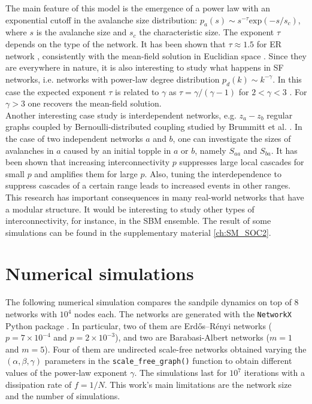  The main feature of this model is the emergence of a power law with an exponential cutoff in the avalanche size distribution: $p_a(s) \sim s^{-\tau}\text{exp}(-s/s_c)$, where $s$ is the avalanche size and $s_c$ the characteristic size. The exponent $\tau$ depends on the type of the network. It has been shown that $\tau \approx 1.5$ for ER network \cite{bonabeau1995sandpile}, consistently with the mean-field solution in Euclidian space \cite{alstrom1988mean}. Since they are everywhere in nature, it is also interesting to study what happens in SF networks, i.e. networks with power-law degree distribution $p_d(k)\sim k^{-\gamma}$. In this case the expected exponent $\tau$ is related to $\gamma$ as $\tau = \gamma/(\gamma - 1)$ for $2<\gamma<3$ \cite{goh2003sandpile}. For $\gamma > 3$ one recovers the mean-field solution.  \\
 Another interesting case study is interdependent networks, e.g. $z_a-z_b$ regular graphs coupled by Bernoulli-distributed coupling studied by Brummitt et al. \cite{brummitt2012suppressing}. In the case of two independent networks $a$ and $b$, one can investigate the sizes of avalanches in $a$ caused by an initial topple in $a$ or $b$, namely $S_{aa}$ and $S_{ba}$. It has been shown that increasing interconnectivity $p$ suppresses large local cascades for small $p$ and amplifies them for large $p$. Also, tuning the interdependence to suppress cascades of a certain range leads to increased events in other ranges. This research has important consequences in many real-world networks that have a modular structure. It would be interesting to study other types of interconnectivity, for instance, in the SBM ensemble. The result of some simulations can be found in the supplementary material \ref{ch:SM_SOC2}.

\section{Numerical simulations}
The following numerical simulation compares the sandpile dynamics on top of $8$ networks with $10^4$ nodes each. The networks are generated with the \texttt{NetworkX} Python package \cite{NetworkX}. In particular, two of them are Erdős–Rényi networks ($p=7\times 10^{-4}$ and $p=2\times 10^{-3}$), and two are Barabasi-Albert networks ($m=1$ and $m=5$). Four of them are undirected scale-free networks obtained varying the $(\alpha, \beta, \gamma)$ parameters in the \texttt{scale\_free\_graph()} function to obtain different values of the power-law exponent $\gamma$. The simulations last for $10^7$ iterations with a dissipation rate of $f=1/N$. This work's main limitations are the network size and the number of simulations. 

